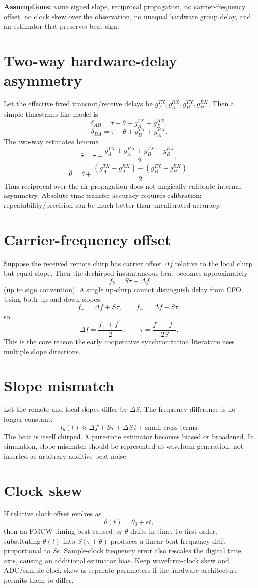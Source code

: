 \documentclass[11pt]{article}
\begin{document}
\textbf{Assumptions:} same signed slope, reciprocal propagation, no carrier-frequency offset, no clock skew over the observation, no unequal hardware group delay, and an estimator that preserves beat sign.

\section{Two-way hardware-delay asymmetry}
Let the effective fixed transmit/receive delays be $g_A^{TX},g_A^{RX},g_B^{TX},g_B^{RX}$. Then a simple timestamp-like model is
\[
\delta_{AB}=\tau+\theta+g_A^{TX}+g_B^{RX},
\]
\[
\delta_{BA}=\tau-\theta+g_B^{TX}+g_A^{RX}.
\]
The two-way estimates become
\[
\hat\tau=\tau+\frac{g_A^{TX}+g_A^{RX}+g_B^{TX}+g_B^{RX}}{2},
\]
\[
\hat\theta=\theta+\frac{(g_A^{TX}-g_A^{RX})-(g_B^{TX}-g_B^{RX})}{2}.
\]
Thus reciprocal over-the-air propagation does not magically calibrate internal asymmetry. Absolute time-transfer accuracy requires calibration; repeatability/precision can be much better than uncalibrated accuracy.

\section{Carrier-frequency offset}
Suppose the received remote chirp has carrier offset $\Delta f$ relative to the local chirp but equal slope. Then the dechirped instantaneous beat becomes approximately
\[
f_b = S\tau + \Delta f
\]
(up to sign convention). A single up-chirp cannot distinguish delay from CFO. Using both up and down slopes,
\[
f_+=\Delta f+S\tau,\qquad f_-=\Delta f-S\tau,
\]
so
\[
\Delta f=\frac{f_++f_-}{2},\qquad \tau=\frac{f_+-f_-}{2S}.
\]
This is the core reason the early cooperative synchronization literature uses multiple slope directions.

\section{Slope mismatch}
Let the remote and local slopes differ by $\Delta S$. The frequency difference is no longer constant:
\[
f_b(t)\approx \Delta f + S\tau + \Delta S\,t + \text{small cross terms}.
\]
The beat is itself chirped. A pure-tone estimator becomes biased or broadened. In simulation, slope mismatch should be represented at waveform generation, not inserted as arbitrary additive beat noise.

\section{Clock skew}
If relative clock offset evolves as
\[
\theta(t)=\theta_0+\epsilon t,
\]
then an FMCW timing beat caused by $\theta$ drifts in time. To first order, substituting $\theta(t)$ into $S(\tau\pm\theta)$ produces a linear beat-frequency drift proportional to $S\epsilon$. Sample-clock frequency error also rescales the digital time axis, causing an additional estimator bias. Keep waveform-clock skew and ADC/sample-clock skew as separate parameters if the hardware architecture permits them to differ.
\end{document}
